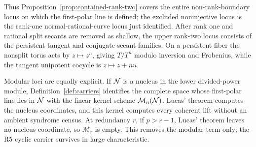 Thus Proposition~\ref{prop:contained-rank-two} covers the entire
non-rank-boundary locus on which the first-polar line is defined; the
excluded noninjective locus is the rank-one normal-rational-curve
locus just identified.  After rank one and rational split secants are removed as shallow, the
upper rank-two locus consists of the persistent tangent and
conjugate-secant families.  On a persistent fiber the nonsplit torus
acts by $z\mapsto z^n$, giving $T/T^n$ modulo inversion and Frobenius,
while the tangent unipotent cocycle is $z\mapsto z+nu$.

Modular loci are equally explicit.  If $\mathcal N$ is a nucleus in the
lower divided-power module, Definition~\ref{def:carriers} identifies
the complete space whose first-polar line lies in \(\mathcal N\) with the
linear kernel scheme \(\mathcal M_n(\mathcal N)\).  Lucas' theorem computes the
nucleus coordinates, and this kernel computes every coherent lift
without an ambient syndrome census.
At redundancy \(r\), if \(p>r-1\), Lucas' theorem leaves no nucleus
coordinate, so \(\mathcal M_r\) is empty.  This removes the modular
term only; the R5 cyclic carrier survives in large characteristic.

